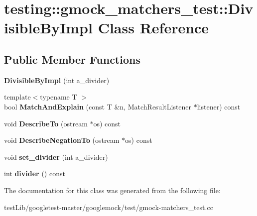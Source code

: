 \hypertarget{classtesting_1_1gmock__matchers__test_1_1DivisibleByImpl}{}\section{testing\+:\+:gmock\+\_\+matchers\+\_\+test\+:\+:Divisible\+By\+Impl Class Reference}
\label{classtesting_1_1gmock__matchers__test_1_1DivisibleByImpl}
\subsection*{Public Member Functions}
\begin{DoxyCompactItemize}
\item 
\mbox{\label{classtesting_1_1gmock__matchers__test_1_1DivisibleByImpl_aab5d8d383a8cbf112fe087c4f0f3f699}} 
{\bfseries Divisible\+By\+Impl} (int a\+\_\+divider)
\item 
\mbox{\label{classtesting_1_1gmock__matchers__test_1_1DivisibleByImpl_a2621df4b34315b327e20b6f4d901417d}} 
{\footnotesize template$<$typename T $>$ }\\bool {\bfseries Match\+And\+Explain} (const T \&n, Match\+Result\+Listener $\ast$listener) const
\item 
\mbox{\label{classtesting_1_1gmock__matchers__test_1_1DivisibleByImpl_aabd14d5f96ef6851141d9ed9fbee3f86}} 
void {\bfseries Describe\+To} (ostream $\ast$os) const
\item 
\mbox{\label{classtesting_1_1gmock__matchers__test_1_1DivisibleByImpl_a9c061ef411c126c604d4c33d92911d50}} 
void {\bfseries Describe\+Negation\+To} (ostream $\ast$os) const
\item 
\mbox{\label{classtesting_1_1gmock__matchers__test_1_1DivisibleByImpl_a86c8787ab835bc84a9ad7e3931d644cc}} 
void {\bfseries set\+\_\+divider} (int a\+\_\+divider)
\item 
\mbox{\label{classtesting_1_1gmock__matchers__test_1_1DivisibleByImpl_afaf102bc25623966dd11805b62e42321}} 
int {\bfseries divider} () const
\end{DoxyCompactItemize}


The documentation for this class was generated from the following file\+:\begin{DoxyCompactItemize}
\item 
test\+Lib/googletest-\/master/googlemock/test/gmock-\/matchers\+\_\+test.\+cc\end{DoxyCompactItemize}
